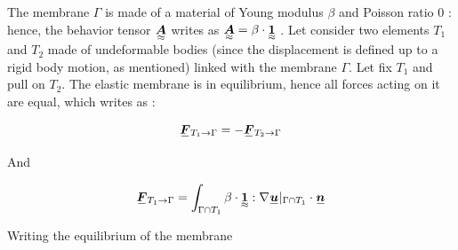 \documentclass[fleqn]{article}
\begin{document}
        The membrane $\Gamma$ is made of a material of Young modulus $\beta$ and Poisson ratio $0$ : hence, the behavior tensor $\tensoriv{A}$ writes as $\tensoriv{A} = \beta \cdot \tensoriv{1}$ . Let consider two elements $T_1$ and $T_2$ made of undeformable bodies (since the displacement is defined up to a rigid body motion, as mentioned) linked with the membrane $\Gamma$. Let fix $T_1$ and pull on $T_2$. The elastic membrane is in equilibrium, hence all forces acting on it are equal, which writes as :

        \begin{equation*}
            \tensori{F}\subscript{T_1 \rightarrow \Gamma} = - \tensori{F}\subscript{T_2 \rightarrow \Gamma}
        \end{equation*}

        And 

        \begin{equation*}
            \tensori{F}\subscript{T_1 \rightarrow \Gamma} = \int_{\Gamma \cap T_1} \beta \cdot \tensoriv{1} : \nabla \tensori{u}\vert_{\Gamma \cap T_1} \cdot \tensori{n}
        \end{equation*}
        
        Writing the equilibrium of the membrane
  
\end{document}
